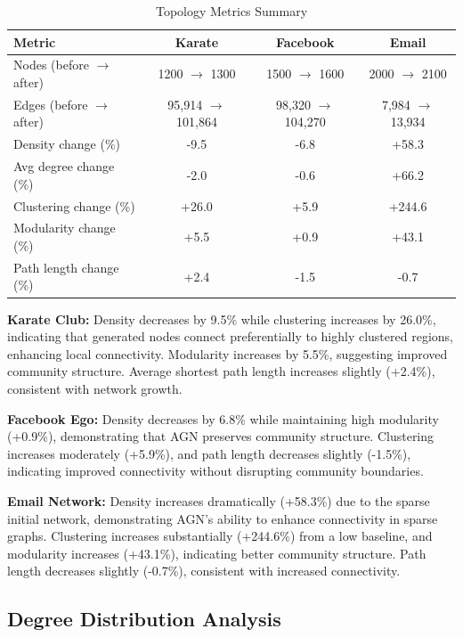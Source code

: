 \documentclass[12pt]{article}
\begin{document}
\begin{table}[h]
\centering
\caption{Topology Metrics Summary}
\label{tab:topology_summary}
\begin{tabular}{lccc}
\toprule
Metric & Karate & Facebook & Email \\
\midrule
Nodes (before $\rightarrow$ after) & 1200 $\rightarrow$ 1300 & 1500 $\rightarrow$ 1600 & 2000 $\rightarrow$ 2100 \\
Edges (before $\rightarrow$ after) & 95,914 $\rightarrow$ 101,864 & 98,320 $\rightarrow$ 104,270 & 7,984 $\rightarrow$ 13,934 \\
Density change (\%) & -9.5 & -6.8 & +58.3 \\
Avg degree change (\%) & -2.0 & -0.6 & +66.2 \\
Clustering change (\%) & +26.0 & +5.9 & +244.6 \\
Modularity change (\%) & +5.5 & +0.9 & +43.1 \\
Path length change (\%) & +2.4 & -1.5 & -0.7 \\
\bottomrule
\end{tabular}
\end{table}

\textbf{Karate Club:} Density decreases by 9.5\% while clustering increases by 26.0\%, indicating that generated nodes connect preferentially to highly clustered regions, enhancing local connectivity. Modularity increases by 5.5\%, suggesting improved community structure. Average shortest path length increases slightly (+2.4\%), consistent with network growth.

\textbf{Facebook Ego:} Density decreases by 6.8\% while maintaining high modularity (+0.9\%), demonstrating that AGN preserves community structure. Clustering increases moderately (+5.9\%), and path length decreases slightly (-1.5\%), indicating improved connectivity without disrupting community boundaries.

\textbf{Email Network:} Density increases dramatically (+58.3\%) due to the sparse initial network, demonstrating AGN's ability to enhance connectivity in sparse graphs. Clustering increases substantially (+244.6\%) from a low baseline, and modularity increases (+43.1\%), indicating better community structure. Path length decreases slightly (-0.7\%), consistent with increased connectivity.

\subsection{Degree Distribution Analysis}
\end{document}
